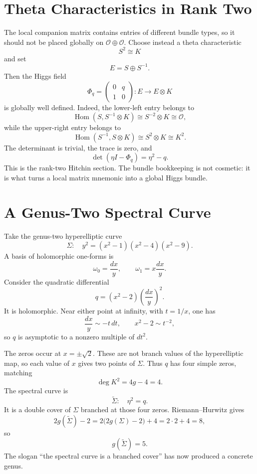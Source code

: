 \section{Theta Characteristics in Rank Two}

The local companion matrix contains entries of different bundle types, so it should not be placed globally on \(\mathcal O\oplus\mathcal O\).  Choose instead a theta characteristic
\[
  S^2\cong K
\]
and set
\[
  E=S\oplus S^{-1}.
\]
Then the Higgs field
\[
  \Phi_q=
  \begin{pmatrix}
    0&q\\
    1&0
  \end{pmatrix}
  :E\longrightarrow E\otimes K
\]
is globally well defined.  Indeed, the lower-left entry belongs to
\[
  \operatorname{Hom}(S,S^{-1}\otimes K)
  \cong S^{-2}\otimes K
  \cong\mathcal O,
\]
while the upper-right entry belongs to
\[
  \operatorname{Hom}(S^{-1},S\otimes K)
  \cong S^2\otimes K
  \cong K^2.
\]
The determinant is trivial, the trace is zero, and
\[
  \det(\eta I-\Phi_q)=\eta^2-q.
\]
This is the rank-two Hitchin section.  The bundle bookkeeping is not cosmetic: it is what turns a local matrix mnemonic into a global Higgs bundle.

\section{A Genus-Two Spectral Curve}

Take the genus-two hyperelliptic curve
\[
  \Sigma:\quad
  y^2=(x^2-1)(x^2-4)(x^2-9).
\]
A basis of holomorphic one-forms is
\[
  \omega_0=\frac{dx}{y},
  \qquad
  \omega_1=x\frac{dx}{y}.
\]
Consider the quadratic differential
\[
  q=(x^2-2)\left(\frac{dx}{y}\right)^2.
\]
It is holomorphic.  Near either point at infinity, with \(t=1/x\), one has
\[
  \frac{dx}{y}\sim -t\,dt,
  \qquad
  x^2-2\sim t^{-2},
\]
so \(q\) is asymptotic to a nonzero multiple of \(dt^2\).

The zeros occur at \(x=\pm\sqrt2\).  These are not branch values of the hyperelliptic map, so each value of \(x\) gives two points of \(\Sigma\).  Thus \(q\) has four simple zeros, matching
\[
  \deg K^2=4g-4=4.
\]
The spectral curve is
\[
  \widetilde\Sigma:\quad \eta^2=q.
\]
It is a double cover of \(\Sigma\) branched at those four zeros.  Riemann--Hurwitz gives
\[
  2g(\widetilde\Sigma)-2
  =2\bigl(2g(\Sigma)-2\bigr)+4
  =2\cdot2+4=8,
\]
so
\[
  \boxed{g(\widetilde\Sigma)=5.}
\]
The slogan “the spectral curve is a branched cover” has now produced a concrete genus.

